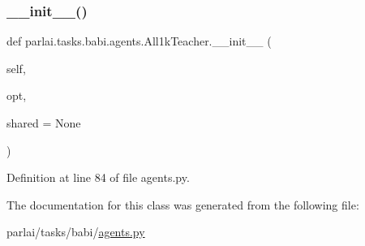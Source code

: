 \subsubsection{\texorpdfstring{\+\_\+\+\_\+init\+\_\+\+\_\+()}{\_\_init\_\_()}}
{\footnotesize\ttfamily def parlai.\+tasks.\+babi.\+agents.\+All1k\+Teacher.\+\_\+\+\_\+init\+\_\+\+\_\+ (\begin{DoxyParamCaption}\item[{}]{self,  }\item[{}]{opt,  }\item[{}]{shared = {\ttfamily None} }\end{DoxyParamCaption})}



Definition at line 84 of file agents.\+py.




The documentation for this class was generated from the following file\+:\begin{DoxyCompactItemize}
\item 
parlai/tasks/babi/\hyperlink{parlai_2tasks_2babi_2agents_8py}{agents.\+py}\end{DoxyCompactItemize}
